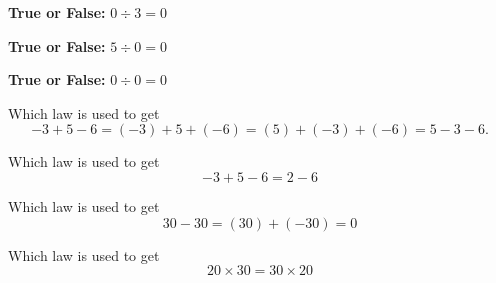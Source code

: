 \documentclass{ximera}
\begin{document}
\begin{shuffle}[3]
\begin{problem}
\textbf{True or False:} $0\div 3= 0$ 
\begin{multipleChoice*}
\end{multipleChoice*}
\end{problem}



\begin{problem}
\textbf{True or False:} $5\div 0= 0$ 
\begin{multipleChoice*}
\end{multipleChoice*}
\end{problem}


\begin{problem}
\textbf{True or False:} $0\div 0= 0$ 
\begin{multipleChoice*}
\end{multipleChoice*}
\end{problem}


\begin{problem}
Which law is used to get $$-3+5-6=(-3)+5+(-6)=(5)+(-3)+(-6)=5-3-6.$$ 
\begin{multipleChoice}
\end{multipleChoice}
\end{problem}


\begin{problem}
Which law is used to get $$-3+5-6=2-6$$ 
\begin{multipleChoice}
\end{multipleChoice}
\end{problem}


\begin{problem}
Which law is used to get $$30-30=(30)+(-30)=0$$ 
\begin{multipleChoice}
\end{multipleChoice}
\end{problem}


\begin{problem}
Which law is used to get $$20\times 30=30\times 20$$ 
\begin{multipleChoice}
\end{multipleChoice}
\end{problem}



\end{shuffle}
\end{document}
